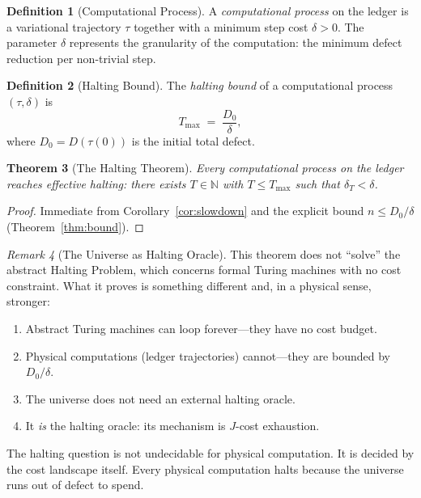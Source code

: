 \documentclass[11pt,a4paper]{article}
\theoremstyle{plain}
\newtheorem{theorem}{Theorem}[section]
\theoremstyle{definition}
\newtheorem{definition}[theorem]{Definition}
\theoremstyle{remark}
\newtheorem{remark}[theorem]{Remark}
\newcommand{\N}{\mathbb{N}}
\newcommand{\Jcost}{J}
\begin{document}
\begin{definition}[Computational Process]\label{def:process}
A \emph{computational process} on the ledger is a variational trajectory $\tau$ together with a minimum step cost $\delta > 0$.
The parameter $\delta$ represents the granularity of the computation: the minimum defect reduction per non-trivial step.
\end{definition}

\begin{definition}[Halting Bound]\label{def:haltingbound}
The \emph{halting bound} of a computational process $(\tau, \delta)$ is
\[
T_{\max} \;=\; \frac{D_0}{\delta},
\]
where $D_0 = D(\tau(0))$ is the initial total defect.
\end{definition}

\begin{theorem}[The Halting Theorem]\label{thm:halting}
Every computational process on the ledger reaches effective halting: there exists $T \in \N$ with $T \le T_{\max}$ such that $\delta_T < \delta$.
\end{theorem}

\begin{proof}
Immediate from Corollary~\ref{cor:slowdown} and the explicit bound $n \le D_0/\delta$ (Theorem~\ref{thm:bound}).
\end{proof}

\begin{remark}[The Universe as Halting Oracle]
This theorem does not ``solve'' the abstract Halting Problem, which concerns formal Turing machines with no cost constraint.
What it proves is something different and, in a physical sense, stronger:

\begin{enumerate}[nosep]
\item Abstract Turing machines can loop forever---they have no cost budget.
\item Physical computations (ledger trajectories) cannot---they are bounded by $D_0/\delta$.
\item The universe does not need an external halting oracle.
\item It \emph{is} the halting oracle: its mechanism is $\Jcost$-cost exhaustion.
\end{enumerate}

The halting question is not undecidable for physical computation.
It is decided by the cost landscape itself.
Every physical computation halts because the universe runs out of defect to spend.
\end{remark}
\end{document}
